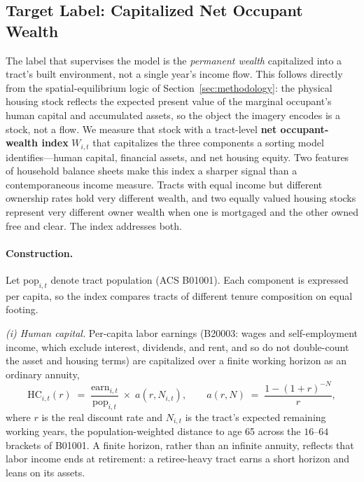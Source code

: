%

\subsection{Target Label: Capitalized Net Occupant Wealth}
\label{sec:wealth}

The label that supervises the model is the \emph{permanent wealth} capitalized into a
tract's built environment, not a single year's income flow. This follows directly from the
spatial-equilibrium logic of Section~\ref{sec:methodology}: the physical housing stock
reflects the expected present value of the marginal occupant's human capital and accumulated
assets, so the object the imagery encodes is a stock, not a flow. We measure that stock with
a tract-level \textbf{net occupant-wealth index} $W_{i,t}$ that capitalizes the three
components a sorting model identifies---human capital, financial assets, and net housing
equity. Two features of household balance sheets make this index a sharper signal than a
contemporaneous income measure. Tracts with equal income but different ownership rates hold
very different wealth, and two equally valued housing stocks represent very different owner
wealth when one is mortgaged and the other owned free and clear. The index addresses both.

\paragraph{Construction.}
Let $\mathrm{pop}_{i,t}$ denote tract population (ACS B01001). Each component is expressed per
capita, so the index compares tracts of different tenure composition on equal footing.

\emph{(i) Human capital.} Per-capita labor earnings (B20003: wages and self-employment
income, which exclude interest, dividends, and rent, and so do not double-count the asset and
housing terms) are capitalized over a finite working horizon as an ordinary annuity,
\begin{equation}
\mathrm{HC}_{i,t}(r) \;=\; \frac{\mathrm{earn}_{i,t}}{\mathrm{pop}_{i,t}}
\;\times\; a(r, N_{i,t}),
\qquad
a(r,N) \;=\; \frac{1-(1+r)^{-N}}{r},
\label{eq:hc}
\end{equation}
where $r$ is the real discount rate and $N_{i,t}$ is the tract's expected remaining working
years, the population-weighted distance to age 65 across the $16$--$64$ brackets of B01001. A
finite horizon, rather than an infinite annuity, reflects that labor income ends at
retirement: a retiree-heavy tract earns a short horizon and leans on its assets.

